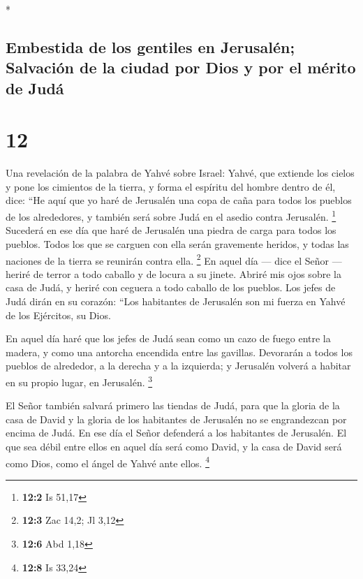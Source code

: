 \begin{paracol}{2}
\begin{otherlanguage}{english}
\end{otherlanguage}

\switchcolumn[0]*

\hypertarget{embestida-de-los-gentiles-en-jerusaluxe9n-salvaciuxf3n-de-la-ciudad-por-dios-y-por-el-muxe9rito-de-juduxe1}{%
\subsection{Embestida de los gentiles en Jerusalén; Salvación de la
ciudad por Dios y por el mérito de
Judá}\label{embestida-de-los-gentiles-en-jerusaluxe9n-salvaciuxf3n-de-la-ciudad-por-dios-y-por-el-muxe9rito-de-juduxe1}}

\hypertarget{section-22}{%
\section{12}\label{section-22}}

 Una revelación de la palabra de Yahvé sobre Israel:
Yahvé, que extiende los cielos y pone los cimientos de la tierra, y
forma el espíritu del hombre dentro de él, dice:  ``He
aquí que yo haré de Jerusalén una copa de caña para todos los pueblos de
los alrededores, y también será sobre Judá en el asedio contra
Jerusalén. \footnote{\textbf{12:2} Is 51,17}  Sucederá en
ese día que haré de Jerusalén una piedra de carga para todos los
pueblos. Todos los que se carguen con ella serán gravemente heridos, y
todas las naciones de la tierra se reunirán contra ella. \footnote{\textbf{12:3}
  Zac 14,2; Jl 3,12}  En aquel día --- dice el Señor ---
heriré de terror a todo caballo y de locura a su jinete. Abriré mis ojos
sobre la casa de Judá, y heriré con ceguera a todo caballo de los
pueblos.  Los jefes de Judá dirán en su corazón: ``Los
habitantes de Jerusalén son mi fuerza en Yahvé de los Ejércitos, su
Dios.

 En aquel día haré que los jefes de Judá sean como un cazo
de fuego entre la madera, y como una antorcha encendida entre las
gavillas. Devorarán a todos los pueblos de alrededor, a la derecha y a
la izquierda; y Jerusalén volverá a habitar en su propio lugar, en
Jerusalén. \footnote{\textbf{12:6} Abd 1,18}

 El Señor también salvará primero las tiendas de Judá,
para que la gloria de la casa de David y la gloria de los habitantes de
Jerusalén no se engrandezcan por encima de Judá.  En ese
día el Señor defenderá a los habitantes de Jerusalén. El que sea débil
entre ellos en aquel día será como David, y la casa de David será como
Dios, como el ángel de Yahvé ante ellos. \footnote{\textbf{12:8} Is
  33,24}


\end{paracol}
